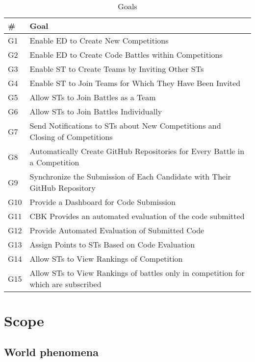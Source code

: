 \begin{table}[H]
  \begin{tabular}{|l|l|}
    \hline
    \textbf{\#} & \textbf{Goal}      \\
    \hline
    G1 & Enable ED to Create New Competitions \\
    \hline
    G2 & Enable ED to Create Code Battles within Competitions \\
    \hline
    G3 & Enable ST to Create Teams by Inviting Other STs \\
    \hline
    G4 & Enable ST to Join Teams for Which They Have Been Invited    \\
    \hline
    G5 & Allow STs to Join Battles as a Team    \\
    \hline
    G6 & Allow STs to Join Battles Individually    \\
    \hline
    G7 & Send Notifications to STs about New Competitions and Closing of Competitions    \\
    \hline
    G8 & Automatically Create GitHub Repositories for Every Battle in a Competition    \\
    \hline
    G9 & Synchronize the Submission of Each Candidate with Their GitHub Repository    \\
    \hline
    G10 & Provide a Dashboard for Code Submission    \\
    \hline
    G11 & CBK Provides an automated evaluation of the code submitted  \\
    \hline
    G12 & Provide Automated Evaluation of Submitted Code  \\
    \hline
    G13 & Assign Points to STs Based on Code Evaluation \\
    \hline
    G14 & Allow STs to View Rankings of Competition \\
    \hline
    G15 & Allow STs to View Rankings of  battles only in competition for which are subscribed \\
    \hline
  \end{tabular}
  \caption{Goals}
  \label{tab:goals}
\end{table}

\section{Scope}
\label{s:Scope}%


\subsection{World phenomena}
\label{ss:world_phenomena}%

